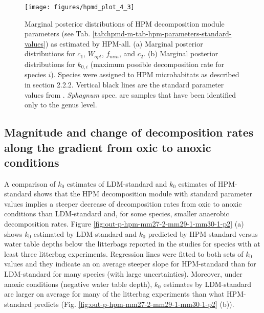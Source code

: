 \documentclass[esd, manuscript]{copernicus}
\begin{document}
\begin{figure}[H]

{\centering \texttt{[image: figures/hpmd\_plot\_4\_3]} 

}

\caption{Marginal posterior distributions of HPM decomposition module parameters (see Tab. \ref{tab:hpmd-m-tab-hpm-parameters-standard-values}) as estimated by HPM-all. (a) Marginal posterior distributions for \(c_1\), \(W_{opt}\), \(f_{min}\), and \(c_2\). (b) Marginal posterior distributions for \(k_{0,i}\) (maximum possible decomposition rate for species \(i\)). Species were assigned to HPM microhabitats as described in section 2.2.2. Vertical black lines are the standard parameter values from \citet{Frolking.2010}. \emph{Sphagnum} spec. are samples that have been identified only to the genus level.}\label{fig:out-mm30-hpm-test-p2}
\end{figure}

\subsection{Magnitude and change of decomposition rates along the gradient from oxic to anoxic conditions}

A comparison of \(k_0\) estimates of LDM-standard and \(k_0\) estimates of HPM-standard shows that the HPM decomposition module with standard parameter values implies a steeper decrease of decomposition rates from oxic to anoxic conditions than LDM-standard and, for some species, smaller anaerobic decomposition rates. Figure \ref{fig:out-p-hpm-mm27-2-mm29-1-mm30-1-p2} (a) shows \(k_0\) estimated by LDM-standard and \(k_0\) predicted by HPM-standard versus water table depths below the litterbags reported in the studies for species with at least three litterbag experiments. Regression lines were fitted to both sets of \(k_0\) values and they indicate an on average steeper slope for HPM-standard than for LDM-standard for many species (with large uncertainties). Moreover, under anoxic conditions (negative water table depth), \(k_0\) estimates by LDM-standard are larger on average for many of the litterbag experiments than what HPM-standard predicts (Fig. \ref{fig:out-p-hpm-mm27-2-mm29-1-mm30-1-p2} (b)).
\end{document}
